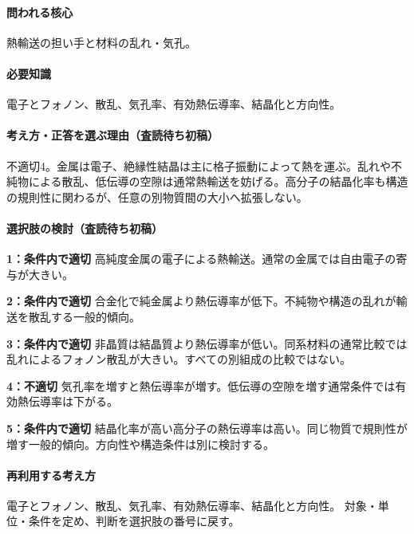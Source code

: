 \paragraph{問われる核心} 熱輸送の担い手と材料の乱れ・気孔。

\paragraph{必要知識} 電子とフォノン、散乱、気孔率、有効熱伝導率、結晶化と方向性。

\paragraph{考え方・正答を選ぶ理由（査読待ち初稿）} 不適切4。金属は電子、絶縁性結晶は主に格子振動によって熱を運ぶ。乱れや不純物による散乱、低伝導の空隙は通常熱輸送を妨げる。高分子の結晶化率も構造の規則性に関わるが、任意の別物質間の大小へ拡張しない。

\paragraph{選択肢の検討（査読待ち初稿）}\mbox{}\par

\noindent\textbf{1：条件内で適切} 高純度金属の電子による熱輸送。通常の金属では自由電子の寄与が大きい。\par

\noindent\textbf{2：条件内で適切} 合金化で純金属より熱伝導率が低下。不純物や構造の乱れが輸送を散乱する一般的傾向。\par

\noindent\textbf{3：条件内で適切} 非晶質は結晶質より熱伝導率が低い。同系材料の通常比較では乱れによるフォノン散乱が大きい。すべての別組成の比較ではない。\par

\noindent\textbf{4：不適切} 気孔率を増すと熱伝導率が増す。低伝導の空隙を増す通常条件では有効熱伝導率は下がる。\par

\noindent\textbf{5：条件内で適切} 結晶化率が高い高分子の熱伝導率は高い。同じ物質で規則性が増す一般的傾向。方向性や構造条件は別に検討する。\par

\paragraph{再利用する考え方} 電子とフォノン、散乱、気孔率、有効熱伝導率、結晶化と方向性。 対象・単位・条件を定め、判断を選択肢の番号に戻す。

